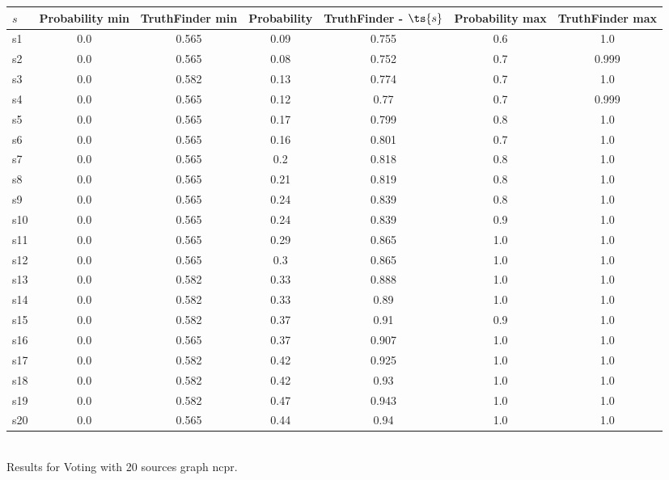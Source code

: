 \documentclass{article}
\begin{document}
\noindent\begin{tabular}{|l|c|c|c|c|c|c|}
\hline
$s$& Probability min & TruthFinder min & Probability & TruthFinder - $\ts{s}$ & Probability max & TruthFinder max\\
\hline
s1 &0.0 & 0.565 & 0.09 & 0.755 & 0.6 & 1.0\\
\hline
s2 &0.0 & 0.565 & 0.08 & 0.752 & 0.7 & 0.999\\
\hline
s3 &0.0 & 0.582 & 0.13 & 0.774 & 0.7 & 1.0\\
\hline
s4 &0.0 & 0.565 & 0.12 & 0.77 & 0.7 & 0.999\\
\hline
s5 &0.0 & 0.565 & 0.17 & 0.799 & 0.8 & 1.0\\
\hline
s6 &0.0 & 0.565 & 0.16 & 0.801 & 0.7 & 1.0\\
\hline
s7 &0.0 & 0.565 & 0.2 & 0.818 & 0.8 & 1.0\\
\hline
s8 &0.0 & 0.565 & 0.21 & 0.819 & 0.8 & 1.0\\
\hline
s9 &0.0 & 0.565 & 0.24 & 0.839 & 0.8 & 1.0\\
\hline
s10 &0.0 & 0.565 & 0.24 & 0.839 & 0.9 & 1.0\\
\hline
s11 &0.0 & 0.565 & 0.29 & 0.865 & 1.0 & 1.0\\
\hline
s12 &0.0 & 0.565 & 0.3 & 0.865 & 1.0 & 1.0\\
\hline
s13 &0.0 & 0.582 & 0.33 & 0.888 & 1.0 & 1.0\\
\hline
s14 &0.0 & 0.582 & 0.33 & 0.89 & 1.0 & 1.0\\
\hline
s15 &0.0 & 0.582 & 0.37 & 0.91 & 0.9 & 1.0\\
\hline
s16 &0.0 & 0.565 & 0.37 & 0.907 & 1.0 & 1.0\\
\hline
s17 &0.0 & 0.582 & 0.42 & 0.925 & 1.0 & 1.0\\
\hline
s18 &0.0 & 0.582 & 0.42 & 0.93 & 1.0 & 1.0\\
\hline
s19 &0.0 & 0.582 & 0.47 & 0.943 & 1.0 & 1.0\\
\hline
s20 &0.0 & 0.565 & 0.44 & 0.94 & 1.0 & 1.0\\
\hline
\end{tabular}\\

\noindent Results for Voting with 20 sources graph ncpr.
\end{document}
